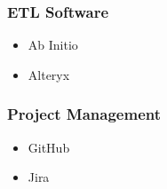\documentclass[letterpaper]{article}
\begin{document}
\begin{fullwidth}[width=\linewidth+2cm]
\begin{minipage}[t]{0.25\linewidth}
\begin{tcolorbox}[breakable, capture=minipage, title=Skills]
    \subsubsection*{ETL Software}%
    \begin{itemize} %
    \item Ab Initio
      \item Alteryx
    \end{itemize}
    \subsubsection*{Project Management}
    \begin{itemize}
    \item GitHub
    \item Jira
    \end{itemize} %
  \end{tcolorbox}
\end{minipage}


\end{fullwidth}
\end{document}
